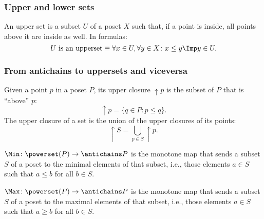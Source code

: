 \subsubsection{Upper and lower sets}

\begin{definition}
\label{def:upperset}An upper set is a subset $U$ of a poset $X$ such
that, if a point is inside, all points above it are inside as well.
In formulas:
\begin{equation}
\text{$U$ is an upperset} \equiv \forall x\in U, \forall y\in X\colon x\leq y \Imp y\in U.
\end{equation}
\end{definition}

\begin{definition}
\label{def:lowerset}
\end{definition}


\subsubsection{From antichains to uppersets and viceversa}


\begin{definition}
\label{def:upperclosure}
Given a point $p$ in a poset $P$, its upper closure $\uparrow p$ is the subset of $P$ that is ``above'' $p$:
    \begin{equation}
        \uparrow p = \{ q\in P \colon p \leq q\}.
    \end{equation}
    The upper closure of a set is the union of the upper closures of its points:
    \begin{equation}
        \uparrow S = \bigcup_{p\in S}\uparrow p.
    \end{equation}
\end{definition}




\begin{definition}
\label{def:Min}
$\Min \colon \powerset(P) \to \antichains P$ is the monotone map that sends a subset $S$ of a poset to the minimal elements of that subset, i.e., those elements $a \in S$ such that $a \leq b$ for all $b \in S$.
\end{definition}
\begin{definition}
\label{def:Max}
$\Max \colon \powerset(P) \to \antichains P$ is the monotone map that sends a subset $S$ of a poset to the maximal elements of that subset, i.e., those elements $a \in S$ such that $a \geq b$ for all $b \in S$.
\end{definition}


